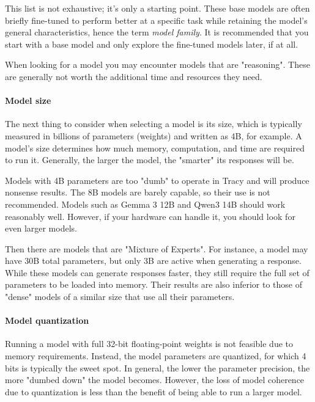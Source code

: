 \documentclass[hidelinks,titlepage,a4paper,twoside]{article}
\begin{document}
This list is not exhaustive; it's only a starting point. These base models are often briefly fine-tuned to perform better at a specific task while retaining the model's general characteristics, hence the term \emph{model family}. It is recommended that you start with a base model and only explore the fine-tuned models later, if at all.

When looking for a model you may encounter models that are "reasoning". These are generally not worth the additional time and resources they need.

\paragraph{Model size}

The next thing to consider when selecting a model is its size, which is typically measured in billions of parameters (weights) and written as 4B, for example. A model's size determines how much memory, computation, and time are required to run it. Generally, the larger the model, the "smarter" its responses will be.

Models with 4B parameters are too "dumb" to operate in Tracy and will produce nonsense results. The 8B models are barely capable, so their use is not recommended. Models such as Gemma 3 12B and Qwen3 14B should work reasonably well. However, if your hardware can handle it, you should look for even larger models.

Then there are models that are "Mixture of Experts". For instance, a model may have 30B total parameters, but only 3B are active when generating a response. While these models can generate responses faster, they still require the full set of parameters to be loaded into memory. Their results are also inferior to those of "dense" models of a similar size that use all their parameters.

\paragraph{Model quantization}

Running a model with full 32-bit floating-point weights is not feasible due to memory requirements. Instead, the model parameters are quantized, for which 4 bits is typically the sweet spot. In general, the lower the parameter precision, the more "dumbed down" the model becomes. However, the loss of model coherence due to quantization is less than the benefit of being able to run a larger model.
\end{document}
